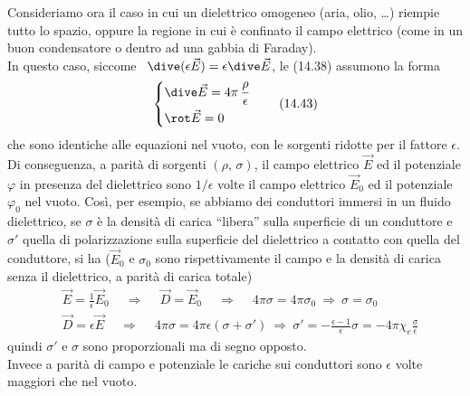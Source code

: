 Consideriamo ora il caso in cui un dielettrico omogeneo (aria, olio, \dots)
riempie tutto lo spazio, oppure la regione in cui \`e confinato il campo
elettrico (come in un buon condensatore o dentro ad una gabbia di Faraday).\\
In questo caso, siccome \ $\dive(\epsilon\vec E)=\epsilon\dive\vec E$, le
(14.38) assumono la forma
\begin{equation}
  \left\{\begin{aligned}
    &\dive\vec E=4\pi\,\frac{\rho}{\epsilon}\\
    &\rot\vec E=0
  \end{aligned}\right.
  \tag{14.43}
\end{equation}
che sono identiche alle equazioni nel vuoto, con le sorgenti ridotte per il
fattore $\epsilon$.\\
Di conseguenza, a parit\`a di sorgenti $(\rho,\,\sigma)$, il campo elettrico
$\vec E$ ed il potenziale $\varphi$ in presenza del dielettrico sono
$1/\epsilon$ volte il campo elettrico $\vec E_0$ ed il potenziale $\varphi_0$
nel vuoto. Cos\`i, per esempio, se abbiamo dei conduttori immersi in un fluido
dielettrico, se $\sigma$ \`e la densit\`a di carica ``libera'' sulla superficie
di un conduttore e $\sigma'$ quella di polarizzazione sulla superficie del
dielettrico a contatto con quella del conduttore, si ha ($\vec E_0$ e $\sigma_0$
sono rispettivamente il campo e la densit\`a di carica senza il dielettrico, a
parit\`a di carica totale)
\begin{equation}
  \begin{aligned}
    &\vec E=\frac{1}{\epsilon}\vec E_0
    \quad\ \Rightarrow\quad\ \vec D=\vec E_0\quad\ \Rightarrow
    \quad\ 4\pi\sigma=4\pi\sigma_0\ \Rightarrow\ \sigma=\sigma_0\\
    &\vec D=\epsilon\vec E
    \quad\ \Rightarrow\quad\ 4\pi\sigma=4\pi\epsilon(\sigma+\sigma')
    \ \Rightarrow\ \sigma'=-\frac{\epsilon-1}{\epsilon}\sigma
    =-4\pi\chi_e\frac{\sigma}{\epsilon}
  \end{aligned}
  \tag{14.44}
\end{equation}
quindi $\sigma'$ e $\sigma$ sono proporzionali ma di segno opposto.\\
Invece a parit\`a di campo e potenziale le cariche sui conduttori sono
$\epsilon$ volte maggiori che nel vuoto.

